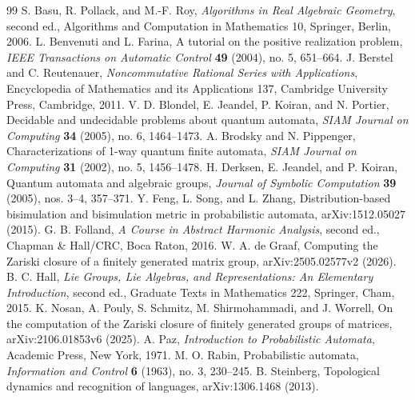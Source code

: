 \begin{thebibliography}{99}
 S. Basu, R. Pollack, and M.-F. Roy, \emph{Algorithms in Real Algebraic Geometry}, second ed., Algorithms and Computation in Mathematics 10, Springer, Berlin, 2006.
 L. Benvenuti and L. Farina, A tutorial on the positive realization problem, \emph{IEEE Transactions on Automatic Control} \textbf{49} (2004), no. 5, 651--664.
 J. Berstel and C. Reutenauer, \emph{Noncommutative Rational Series with Applications}, Encyclopedia of Mathematics and its Applications 137, Cambridge University Press, Cambridge, 2011.
 V. D. Blondel, E. Jeandel, P. Koiran, and N. Portier, Decidable and undecidable problems about quantum automata, \emph{SIAM Journal on Computing} \textbf{34} (2005), no. 6, 1464--1473.
 A. Brodsky and N. Pippenger, Characterizations of 1-way quantum finite automata, \emph{SIAM Journal on Computing} \textbf{31} (2002), no. 5, 1456--1478.
 H. Derksen, E. Jeandel, and P. Koiran, Quantum automata and algebraic groups, \emph{Journal of Symbolic Computation} \textbf{39} (2005), nos. 3--4, 357--371.
 Y. Feng, L. Song, and L. Zhang, Distribution-based bisimulation and bisimulation metric in probabilistic automata, arXiv:1512.05027 (2015).
 G. B. Folland, \emph{A Course in Abstract Harmonic Analysis}, second ed., Chapman \& Hall/CRC, Boca Raton, 2016.
 W. A. de Graaf, Computing the Zariski closure of a finitely generated matrix group, arXiv:2505.02577v2 (2026).
 B. C. Hall, \emph{Lie Groups, Lie Algebras, and Representations: An Elementary Introduction}, second ed., Graduate Texts in Mathematics 222, Springer, Cham, 2015.
 K. Nosan, A. Pouly, S. Schmitz, M. Shirmohammadi, and J. Worrell, On the computation of the Zariski closure of finitely generated groups of matrices, arXiv:2106.01853v6 (2025).
 A. Paz, \emph{Introduction to Probabilistic Automata}, Academic Press, New York, 1971.
 M. O. Rabin, Probabilistic automata, \emph{Information and Control} \textbf{6} (1963), no. 3, 230--245.
 B. Steinberg, Topological dynamics and recognition of languages, arXiv:1306.1468 (2013).
\end{thebibliography}
